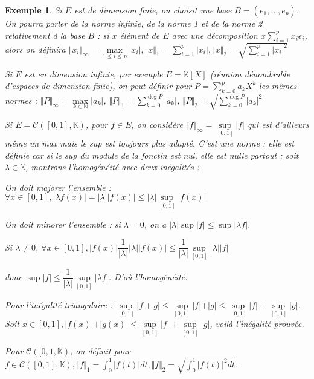 \documentclass[a4paper,12pt]{book}
\newtheorem{Exe}{Exemple}[section]
\def\N{\mathbb{N}}
\def\K{\mathbb{K}}
\begin{document}
\begin{Exe}
Si $E$ est de dimension finie, on choisit une base $B = (e_1,..., e_p)$. On pourra parler de la norme infinie, de la norme 1 et de la norme 2 relativement à la base $B$ : si $x$ élément de $E$ avec une décomposition $x\sum\limits_{i=1}^px_ie_i$, alors on définira $\Vert x_i\Vert_\infty = \max\limits_{1\leq i\leq p}\vert x_i\vert, \Vert x\Vert_1 = \sum\limits_{i=1}^p\vert x_i\vert, \Vert x\Vert_2 = \sqrt{\sum\limits_{i=1}^p \vert x_i\vert^2}$
\par Si $E$ est en dimension infinie, par exemple $E=\K[X]$ (réunion dénombrable d'espaces de dimension finie), on peut définir pour $P=\sum\limits_{k=0}^pa_kX^k$ les mêmes normes : $\Vert P\Vert_\infty = \max\limits_{k\in\N} \vert a_k\vert$, $\Vert P\Vert_1 = \sum\limits_{k=0}^{\deg P} \vert a_k\vert$, $\Vert P\Vert_2 = \sqrt{\sum\limits_{k=0}^{\deg P}\vert a_k\vert^2}$
\par Si $E = \mathcal{C}([0,1],\K)$, pour $f\in E$, on considère $\Vert f\Vert_\infty =\sup\limits_{[0,1]}\vert f\vert$ qui est d'ailleurs même un max mais le sup est toujours plus adapté. C'est une norme : elle est définie car si le sup du module de la fonctin est nul, elle est nulle partout ; soit $\lambda\in\K$, montrons l'homogénéité avec deux inégalités :
\par On doit majorer l'ensemble : $\forall x\in[0,1], \vert\lambda f(x)\vert =\vert\lambda\vert\vert f(x)\vert \leq\vert\lambda\vert\sup\limits_{[0,1]}\vert f(x)\vert$ 
\par On doit minorer l'ensemble : si $\lambda=0$, on a $\vert\lambda\vert \sup\vert f\vert\leq \sup\vert\lambda f\vert$. \par Si $\lambda\neq 0$, $\forall x\in[0,1], \vert f(x)\vert \dfrac{1}{\vert\lambda\vert}\vert\lambda\vert \vert f(x)\vert \leq \dfrac{1}{\vert\lambda\vert}\sup\limits_{[0,1]}\vert\lambda\vert\vert f\vert$ \par donc $\sup\vert f\vert\leq\dfrac{1}{\vert\lambda\vert}\sup\limits_{[0,1]}\vert\lambda f\vert$. D'où l'homogénéité.
\par Pour l'inégalité triangulaire : $\sup\limits_{[0,1]}\vert f+g\vert \leq \sup\limits_{[0,1]} \vert f\vert +\vert g\vert\leq \sup\limits_{[0,1]}\vert f\vert +\sup\limits_{[0,1]}\vert g\vert$. Soit $x\in[0,1], \vert f(x)\vert + \vert g(x)\vert\leq \sup\limits_{[0,1]}\vert f\vert + \sup\limits_{[0,1]}\vert g\vert$, voilà l'inégalité prouvée.
\par Pour $\mathcal{C}([0,1,\K)$, on définit pour $f\in\mathcal{C}([0,1],\K), \Vert f\Vert_1 =\int_0^1\vert f(t)\vert dt, \Vert f\Vert_2=\sqrt{\int_0^1\vert f(t)\vert^2dt}$.

\end{Exe}
\end{document}
